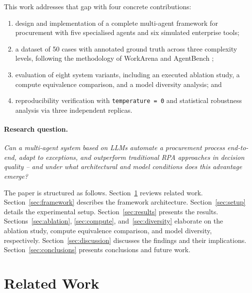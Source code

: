 \documentclass[preprint,12pt,authoryear]{elsarticle}
\begin{document}
This work addresses that gap with four concrete contributions:
\begin{enumerate}[label=(\arabic*)]
  \item design and implementation of a complete multi-agent framework for
        procurement with five specialised agents and six simulated enterprise
        tools;
  \item a dataset of 50 cases with annotated ground truth across three
        complexity levels, following the methodology of WorkArena
        \citep{drouin2024workarena} and AgentBench \citep{liu2023agentbench};
  \item evaluation of eight system variants, including an executed ablation
        study, a compute equivalence comparison, and a model diversity
        analysis; and
  \item reproducibility verification with \texttt{temperature\,=\,0} and
        statistical robustness analysis via three independent replicas.
\end{enumerate}

\paragraph{Research question.}
\textit{Can a multi-agent system based on LLMs automate a procurement process
end-to-end, adapt to exceptions, and outperform traditional RPA approaches in
decision quality -- and under what architectural and model conditions does this
advantage emerge?}

The paper is structured as follows.
Section~\ref{sec:related} reviews related work.
Section~\ref{sec:framework} describes the framework architecture.
Section~\ref{sec:setup} details the experimental setup.
Section~\ref{sec:results} presents the results.
Sections~\ref{sec:ablation}, \ref{sec:compute}, and~\ref{sec:diversity}
elaborate on the ablation study, compute equivalence comparison, and model
diversity, respectively.
Section~\ref{sec:discussion} discusses the findings and their implications.
Section~\ref{sec:conclusions} presents conclusions and future work.

\section{Related Work}
\label{sec:related}
\end{document}
